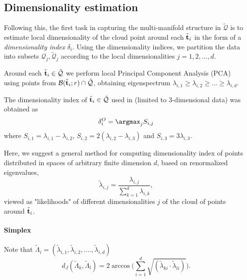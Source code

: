 \subsection{Dimensionality estimation}
Following this, the first task in capturing the multi-manifold structure in $\tilde{\mathcal{Q}}$ is to estimate local dimensionality of the cloud point around each $\tilde{\boldsymbol{\mathbf{t}}}_i$
in the form of a \emph{dimensionality index} $\delta_i$.
Using the dimensionality indices, we partition the data into subsets $\mathcal{Q}_j, \tilde{\mathcal{Q}}_j$ according to the local dimensionalities $j=1,2,...,d$.

Around each $\tilde{\boldsymbol{\mathbf{t}}}_i \in \tilde{ \mathcal{Q}}$ we perform local Principal Component Analysis (PCA) using points from  $\mathcal{B}(\tilde{\boldsymbol{\mathbf{t}}}_i;r) \cap \tilde {\mathcal{Q}}$, obtaining eigenspectrum $\lambda_{i,1} \ge \lambda_{i,2} \ge ... \ge \lambda_{i,d}$.

The dimensionality index of $\tilde{\boldsymbol{\mathbf{t}}}_i \in \tilde{ \mathcal{Q}}$ used in \cite{10.1007/978-3-540-87481-2_37} (limited to 3-dimensional data) was obtained as
\begin{equation}
	\delta^O_i = \argmax_j S_{i,j} 
\end{equation}
where $ S_{i,1} = {\lambda}_{i,1} - {\lambda}_{i,2}$, $S_{i,2} = 2 ({\lambda}_{i,2} - {\lambda}_{i,3})$ and $S_{i,3} = 3 {\lambda}_{i,3}$.

Here, we suggest a general method for computing dimensionality index of points distributed in spaces of arbitrary finite dimension $d$, based on renormalized eigenvalues, 
\[
\tilde{\lambda}_{i,j} = \frac{\lambda_{i,j}}{\sum_{k=1}^d \lambda_{i,k}},
\]
viewed as "likelihoods" of different dimensionalities $j$ of the cloud of points around $\tilde{\boldsymbol{\mathbf{t}}}_i$.
\paragraph{Simplex}
Note that 
$\tilde{\Lambda}_i = (\tilde{\lambda}_{i,1}, \tilde{\lambda}_{i,2},....,\tilde{\lambda}_{i,d})$
\begin{equation}\label{eq:FishDist}
	d_J(\tilde{\Lambda}_k,\tilde{\Lambda}_l) = 2\arccos{\Bigg(\sum_{i=1}^{d} \sqrt{(\tilde{\lambda}_{ki} \cdot \tilde{\lambda}_{li})}\Bigg)}.
\end{equation}

